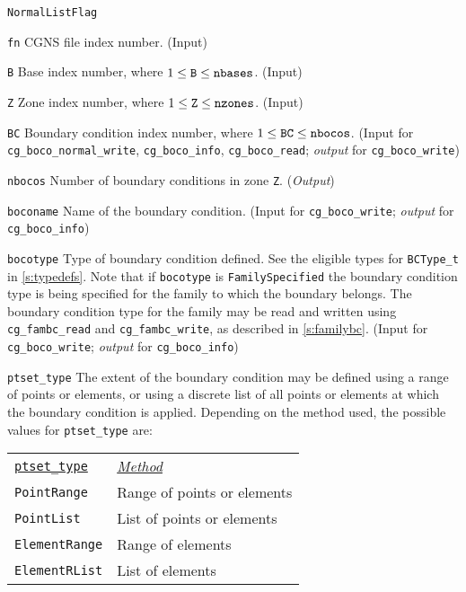 \begin{Ventryi}{\texttt{NormalListFlag}}\raggedright
\item [\texttt{fn}]
      CGNS file index number.
      (\textcolor{input}{Input})
\item [\texttt{B}]
      Base index number, where $1 \leq \text{\texttt{B}} \leq \text{\texttt{nbases}}$.
      (\textcolor{input}{Input})
\item [\texttt{Z}]
      Zone index number, where $1 \leq \text{\texttt{Z}} \leq \text{\texttt{nzones}}$.
      (\textcolor{input}{Input})
\item [\texttt{BC}]
      Boundary condition index number, where $1 \leq \text{\texttt{BC}} \leq \text{\texttt{nbocos}}$.
      (\textcolor{input}{Input} for \texttt{cg\_boco\_normal\_write},
      \texttt{cg\_boco\_info}, \texttt{cg\_boco\_read};
      \textcolor{output}{\textit{output}} for \texttt{cg\_boco\_write})
\item [\texttt{nbocos}]
      Number of boundary conditions in zone \texttt{Z}.
      (\textcolor{output}{\textit{Output}})
\item [\texttt{boconame}]
      Name of the boundary condition.
      (\textcolor{input}{Input} for \texttt{cg\_boco\_write};
      \textcolor{output}{\textit{output}} for \texttt{cg\_boco\_info})
\item [\texttt{bocotype}]
      Type of boundary condition defined.
      See the eligible types for \texttt{BCType\_t} in \autoref{s:typedefs}.
      Note that if \texttt{bocotype} is \texttt{FamilySpecified}
      the boundary condition type is being specified for the family
      to which the boundary belongs.
      The boundary condition type for the family may be read and written
      using \texttt{cg\_fambc\_read} and \texttt{cg\_fambc\_write},
      as described in \autoref{s:familybc}.
      (\textcolor{input}{Input} for \texttt{cg\_boco\_write};
      \textcolor{output}{\textit{output}} for \texttt{cg\_boco\_info})
\item [\texttt{ptset\_type}]
      The extent of the boundary condition may be defined using a range
      of points or elements, or using a discrete list of all points or
      elements at which the boundary condition is applied.
      Depending on the method used, the possible values for
      \texttt{ptset\_type} are:

      \setlength{\tmplength}{\extrarowheight}	%
      \setlength{\extrarowheight}{0pt}
      \begin{tabular}{@{}l >{\ttfamily}l}
         \uline{\texttt{ptset\_type}} & \uline{\textit{Method}} \\
         \texttt{PointRange}   & Range of points or elements \\
         \texttt{PointList}    & List of points or elements \\
         \texttt{ElementRange} & Range of elements \\
         \texttt{ElementRList} & List of elements
      \end{tabular}
      \setlength{\extrarowheight}{\tmplength}


\end{Ventryi}
